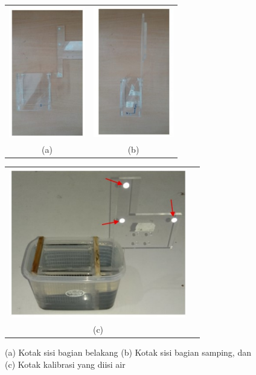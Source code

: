 \begin{figure}[htbp]
	\centering
	\begin{tabular}{ll}
		\includegraphics[scale=0.8]{bab2/kotak_sisi_belakang_kalibrasi.png}
		&
		\includegraphics[scale=0.8]{bab2/kotak_sisi_samping_kalibrasi.png} \\
		\multicolumn{1}{c}{(a)} & \multicolumn{1}{c}{(b)} 
		
	\end{tabular}
	
	\begin{tabular}{ll}
		\includegraphics[scale=0.5]{bab2/kotak_kalibrasi_keseluruhan.png}\\
		\multicolumn{1}{c}{(c)}  
		
	\end{tabular}
	\caption{(a) Kotak sisi bagian belakang (b) Kotak sisi bagian samping, dan (c) Kotak kalibrasi yang diisi air}
	\label{fig:desain_kotak_kalibrasi}
\end{figure}


